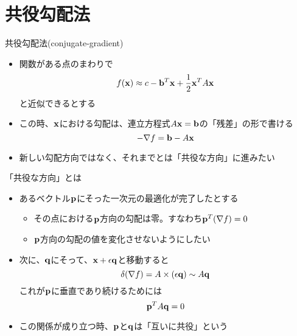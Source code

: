 \section{共役勾配法}

\begin{frame}[t,fragile]{共役勾配法(conjugate-gradient)}
  \begin{itemize}
    \setlength{\itemsep}{1em}
  \item 関数がある点のまわりで
    \[
    f({\bf x}) \approx c - {\bf b}^T {\bf x} + \frac{1}{2} {\bf x}^T A {\bf x}
    \]
    と近似できるとする
  \item この時、${\bf x}$における勾配は、連立方程式$A{\bf x}={\bf b}$の「残差」の形で書ける
    \[
    -\nabla f = {\bf b} - A {\bf x}
    \]
  \item 新しい勾配方向ではなく、それまでとは「共役な方向」に進みたい
  \end{itemize}
\end{frame}

\begin{frame}[t,fragile]{「共役な方向」とは}
  \begin{itemize}
    \setlength{\itemsep}{1em}
  \item あるベクトル${\bf p}$にそった一次元の最適化が完了したとする
    \begin{itemize}
    \item その点における${\bf p}$方向の勾配は零。すなわち${\bf p}^T (\nabla f)=0$
    \item ${\bf p}$方向の勾配の値を変化させないようにしたい
  \end{itemize}
  \item 次に、${\bf q}$にそって、${\bf x}+\epsilon {\bf q}$と移動すると
    \[
      \delta(\nabla f) = A \times (\epsilon {\bf q}) \sim A {\bf q}
      \]
      これが${\bf p}$に垂直であり続けるためには
    \[
      {\bf p}^T A {\bf q} = 0
      \]
    \item この関係が成り立つ時、${\bf p}$と${\bf q}$は「互いに共役」という
  \end{itemize}
\end{frame}

